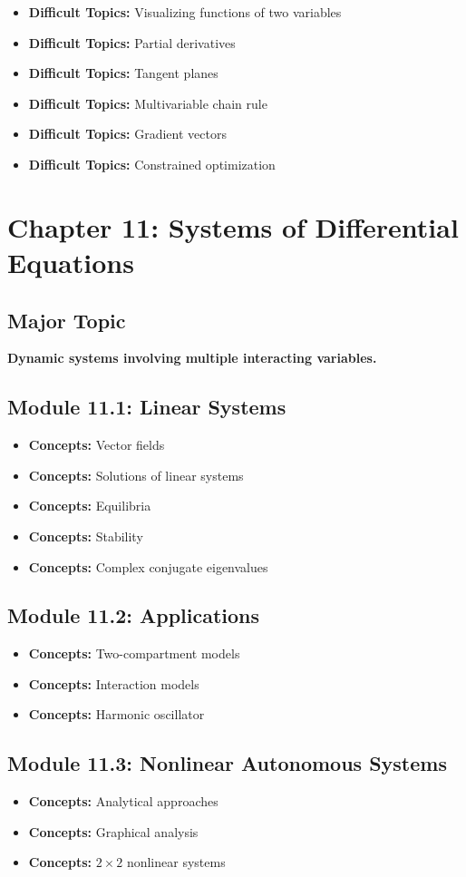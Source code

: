 \documentclass[11pt]{article}
\newcommand{\concept}[1]{\item \textbf{Concepts:} #1}
\newcommand{\difficult}[1]{\item \textbf{Difficult Topics:} #1}
\begin{document}
\begin{itemize}
    \difficult{Visualizing functions of two variables}
    \difficult{Partial derivatives}
    \difficult{Tangent planes}
    \difficult{Multivariable chain rule}
    \difficult{Gradient vectors}
    \difficult{Constrained optimization}
\end{itemize}


\section{Chapter 11: Systems of Differential Equations}

\subsection{Major Topic}

\textbf{Dynamic systems involving multiple interacting variables.}

\subsection{Module 11.1: Linear Systems}

\begin{itemize}
    \concept{Vector fields}
    \concept{Solutions of linear systems}
    \concept{Equilibria}
    \concept{Stability}
    \concept{Complex conjugate eigenvalues}
\end{itemize}

\subsection{Module 11.2: Applications}

\begin{itemize}
    \concept{Two-compartment models}
    \concept{Interaction models}
    \concept{Harmonic oscillator}
\end{itemize}

\subsection{Module 11.3: Nonlinear Autonomous Systems}

\begin{itemize}
    \concept{Analytical approaches}
    \concept{Graphical analysis}
    \concept{$2\times2$ nonlinear systems}
\end{itemize}
\end{document}
